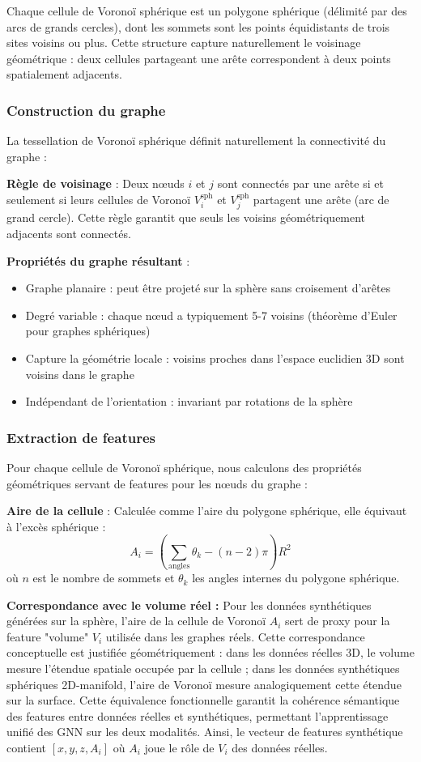 Chaque cellule de Voronoï sphérique est un polygone sphérique (délimité par des arcs de grands cercles), dont les sommets sont les points équidistants de trois sites voisins ou plus. Cette structure capture naturellement le voisinage géométrique : deux cellules partageant une arête correspondent à deux points spatialement adjacents.

\subsubsection{Construction du graphe}

La tessellation de Voronoï sphérique définit naturellement la connectivité du graphe :

\textbf{Règle de voisinage} : Deux nœuds $i$ et $j$ sont connectés par une arête si et seulement si leurs cellules de Voronoï $V_i^{\text{sph}}$ et $V_j^{\text{sph}}$ partagent une arête (arc de grand cercle). Cette règle garantit que seuls les voisins géométriquement adjacents sont connectés.

\textbf{Propriétés du graphe résultant} :
\begin{itemize}
    \item Graphe planaire : peut être projeté sur la sphère sans croisement d'arêtes
    \item Degré variable : chaque nœud a typiquement 5-7 voisins (théorème d'Euler pour graphes sphériques)
    \item Capture la géométrie locale : voisins proches dans l'espace euclidien 3D sont voisins dans le graphe
    \item Indépendant de l'orientation : invariant par rotations de la sphère
\end{itemize}

\subsubsection{Extraction de features}

Pour chaque cellule de Voronoï sphérique, nous calculons des propriétés géométriques servant de features pour les nœuds du graphe :

\textbf{Aire de la cellule} : Calculée comme l'aire du polygone sphérique, elle équivaut à l'excès sphérique :
\[
A_i = \left(\sum_{\text{angles}} \theta_k - (n-2)\pi\right) R^2
\]
où $n$ est le nombre de sommets et $\theta_k$ les angles internes du polygone sphérique.

\textbf{Correspondance avec le volume réel :}
Pour les données synthétiques générées sur la sphère, l'aire de la cellule de Voronoï $A_i$ sert de proxy pour la feature "volume" $V_i$ utilisée dans les graphes réels. Cette correspondance conceptuelle est justifiée géométriquement : dans les données réelles 3D, le volume mesure l'étendue spatiale occupée par la cellule ; dans les données synthétiques sphériques 2D-manifold, l'aire de Voronoï mesure analogiquement cette étendue sur la surface. Cette équivalence fonctionnelle garantit la cohérence sémantique des features entre données réelles et synthétiques, permettant l'apprentissage unifié des GNN sur les deux modalités. Ainsi, le vecteur de features synthétique contient $[x, y, z, A_i]$ où $A_i$ joue le rôle de $V_i$ des données réelles.

